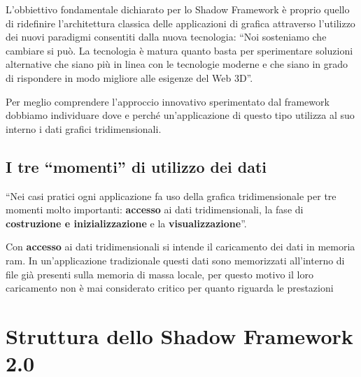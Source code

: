 L'obbiettivo fondamentale dichiarato per lo Shadow Framework è proprio quello di ridefinire l'architettura classica delle applicazioni di grafica attraverso l'utilizzo dei nuovi paradigmi consentiti dalla nuova tecnologia: ``Noi sosteniamo che cambiare si può. La tecnologia è matura quanto basta per sperimentare soluzioni alternative che siano più in linea con le tecnologie moderne e che siano in grado di rispondere in modo migliore alle esigenze del Web 3D''\cite{site:shadowframework}.

Per meglio comprendere l'approccio innovativo sperimentato dal framework dobbiamo individuare dove e perché un'applicazione di questo tipo utilizza al suo interno i dati grafici tridimensionali.

\subsection{I tre ``momenti'' di utilizzo dei dati}
``Nei casi pratici ogni applicazione fa uso della grafica tridimensionale per tre momenti molto importanti: \textbf{accesso} ai dati tridimensionali, la fase di \textbf{costruzione e inizializzazione} e la \textbf{visualizzazione}''\cite{site:shadowframework}.

Con \textbf{accesso} ai dati tridimensionali si intende il caricamento dei dati in memoria ram. In un'applicazione tradizionale questi dati sono memorizzati all'interno di file già presenti sulla memoria di massa locale, per questo motivo il loro caricamento non è mai considerato critico per quanto riguarda le prestazioni



\section{Struttura dello Shadow Framework 2.0}
\label{sec:sfstructure}
